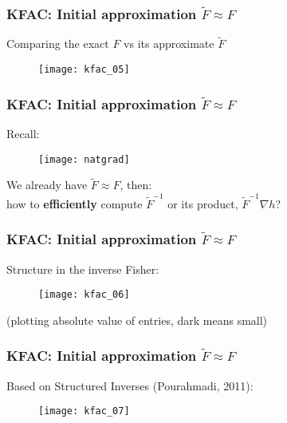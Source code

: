 \begin{frame}
\frametitle{KFAC: Initial approximation $\tilde{F} \approx F$}
Comparing the exact $F$ vs its approximate $\tilde{F}$
\begin{figure}
    \centering
    \texttt{[image: kfac\_05]}
\end{figure}

\end{frame}

\begin{frame}
\frametitle{KFAC: Initial approximation $\tilde{F} \approx F$}
Recall:
\begin{figure}
    \raggedright
    \texttt{[image: natgrad]}
\end{figure}

We already have $\tilde{F} \approx F$, then: \\
how to \textbf{efficiently} compute $\tilde{F}^{-1}$ or its product, $\tilde{F}^{-1}\nabla h$?
\end{frame}

\begin{frame}
\frametitle{KFAC: Initial approximation $\tilde{F} \approx F$}
Structure in the inverse Fisher:
\begin{figure}
    \centering
    \texttt{[image: kfac\_06]}
\end{figure}
(plotting absolute value of entries, dark means small)
\end{frame}

\begin{frame}
\frametitle{KFAC: Initial approximation $\tilde{F} \approx F$}
Based on Structured Inverses (Pourahmadi, 2011):
\begin{figure}
    \raggedright
    \texttt{[image: kfac\_07]}
\end{figure}
\end{frame}
